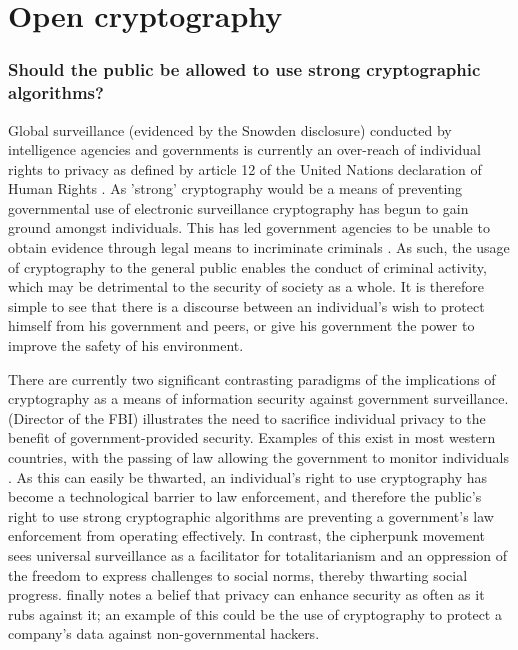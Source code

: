 \documentclass[british,10pt,a4paper]{article}
\begin{document}
\clearpage
\section{Open cryptography}
\subsubsection{Should the public be allowed to use strong cryptographic algorithms?}

Global surveillance (evidenced by the Snowden disclosure) conducted by intelligence agencies and governments is currently an over-reach of individual rights to privacy as defined by article 12 of the United Nations declaration of Human Rights \cite{udhr}. As 'strong' cryptography would be a means of preventing governmental use of electronic surveillance cryptography has begun to gain ground amongst individuals. This has led government agencies to be unable to obtain evidence through legal means to incriminate criminals \cite{James_B_Coney}. As such, the usage of cryptography to the general public enables the conduct of criminal activity, which may be detrimental to the security of society as a whole. It is therefore simple to see that there is a discourse between an individual's wish to protect himself from his government and peers, or give his government the power to improve the safety of his environment.

There are currently two significant contrasting paradigms of the implications of cryptography as a means of information security against government surveillance. \citet{James_B_Coney} (Director of the FBI) illustrates the need to sacrifice individual privacy to the benefit of government-provided security. Examples of this exist in most western countries, with the passing of law allowing the government to monitor individuals \cite{data_retention}. As this can easily be thwarted, an individual's right to use cryptography has become a technological barrier to law enforcement, and therefore the public's right to use strong cryptographic algorithms are preventing a government's law enforcement from operating effectively. In contrast, the cipherpunk movement \cite{Rogaway} sees universal surveillance as a facilitator for totalitarianism and an oppression of the freedom to express challenges to social norms, thereby thwarting social progress. \citeauthor{Rogaway} finally notes a belief that privacy can enhance security as often as it rubs against it; an example of this could be the use of cryptography to protect a company's data against non-governmental hackers. 
\end{document}
